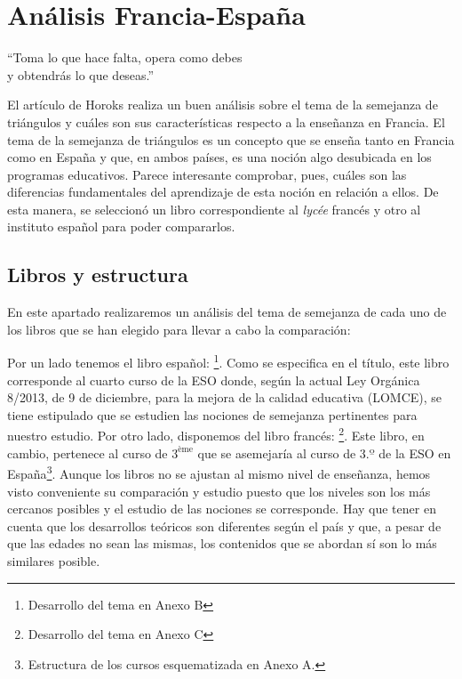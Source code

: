 \chapter{Análisis Francia-España}
\begin{dedication} 
\large ``Toma lo que hace falta, opera como debes\\ y obtendrás lo que deseas.''
\end{dedication}

	El artículo de Horoks realiza un buen análisis sobre el tema de la semejanza de triángulos y cuáles son sus características respecto a la enseñanza en Francia. El tema de la semejanza de triángulos es un concepto que se enseña tanto en Francia como en España y que, en ambos países, es una noción algo desubicada en los programas educativos. Parece interesante comprobar, pues, cuáles son las diferencias fundamentales del aprendizaje de esta noción en relación a ellos. De esta manera, se seleccionó un libro correspondiente al \textit{lycée} francés y otro al instituto español para poder compararlos.
	
\section{Libros y estructura}

	En este apartado realizaremos un análisis del tema de semejanza de cada uno de los libros que se han elegido para llevar a cabo la comparación:
	
	Por un lado tenemos el libro español: \citealp*{spa}\footnote{Desarrollo del tema en Anexo B}. Como se especifica en el título, este libro corresponde al cuarto curso de la ESO donde, según la actual Ley Orgánica 8/2013, de 9 de diciembre, para la mejora de la calidad educativa (LOMCE), se tiene estipulado que se estudien las nociones de semejanza pertinentes para nuestro estudio. Por otro lado, disponemos del libro francés: \citet{fr}\footnote{Desarrollo del tema en Anexo C}. Este libro, en cambio, pertenece al curso de $3^{\text{ème}}$ que se asemejaría al curso de $3.º$ de la ESO en España\footnote{Estructura de los cursos esquematizada en Anexo A.}. Aunque los libros no se ajustan al mismo nivel de enseñanza, hemos visto conveniente su comparación y estudio puesto que los niveles son los más cercanos posibles y el estudio de las nociones se corresponde. Hay que tener en cuenta que los desarrollos teóricos son diferentes según el país y que, a pesar de que las edades no sean las mismas, los contenidos que se abordan sí son lo más similares posible.
	
